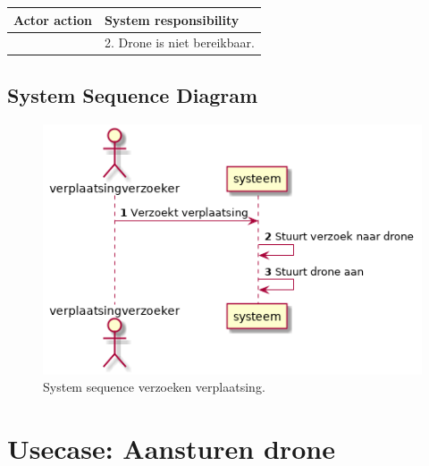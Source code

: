 \documentclass[a4paper, 11pt, oneside]{report}
\begin{document}
\begin{table}[H]
	\centering
	\begin{tabular}{|l|l|}
		\hline
		\rowcolor[HTML]{C0C0C0} 
		Actor action  & System responsibility   \\ \hline
	    & 2. Drone is niet bereikbaar. \\ \hline
	\end{tabular}
\end{table}


\subsection{System Sequence Diagram }
\label{Usecase:verzoekverplaatsing:systemsequence}

\begin{figure}[H]
	\begin{center}\includegraphics[height=.3\textheight]{UML/out/usecase/sequence/verzoekendroneverplaatsing/verzoekendroneverplaatsing.png}\end{center}
	\caption{System sequence verzoeken verplaatsing.}
	\label{fig:verzoekverplaatsing:systemsequence}
\end{figure}


\section[Aansturen drone]{Usecase: Aansturen drone}
\label{Usecase:aansturendrone}
\end{document}
